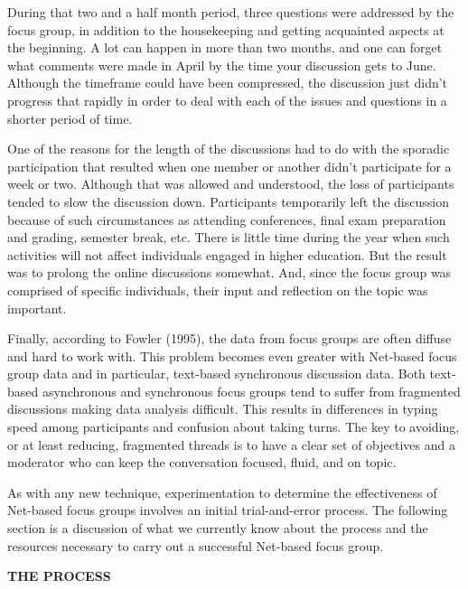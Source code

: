 \documentclass [8pt]{beamer}
\begin{document}
\begin{frame}
\justifying	
	During that two and a half month period, three questions were addressed by the focus group, in addition to the housekeeping and getting acquainted aspects at the beginning. A lot can happen in more than two months, and one can forget what comments were made in April by the time your discussion gets to June. Although the timeframe could have been compressed, the discussion just didn't progress that rapidly in order to deal with each of the issues and questions in a shorter period of time.
	
	One of the reasons for the length of the discussions had to do with the sporadic participation that resulted when one member or another didn't participate for a week or two. Although that was allowed and understood, the loss of participants tended to slow the discussion down. Participants temporarily left the discussion because of such circumstances as attending conferences, final exam preparation and grading, semester break, etc. There is little time during the year when such activities will not affect individuals engaged in higher education. But the result was to prolong the online discussions somewhat. And, since the focus group was comprised of specific individuals, their input and reflection on the topic was important.


Finally, according to Fowler (1995), the data from focus groups are often diffuse and hard to work with. This problem becomes even greater with Net-based focus group data and in particular, text-based synchronous discussion data. Both text-based asynchronous and synchronous focus groups tend to suffer from fragmented discussions making data analysis difficult. This results in differences in typing speed among participants and confusion about taking turns. The key to avoiding, or at least reducing, fragmented threads is to have a clear set of objectives and a moderator who can keep the conversation focused, fluid, and on topic.

As with any new technique, experimentation to determine the effectiveness of Net-based focus groups involves an initial trial-and-error process. The following section is a discussion of what we currently know about the process and the resources necessary to carry out a successful Net-based focus group.

\vspace{0.1cm}
{\large\textbf{THE PROCESS}}



\end{frame}
\end{document}
